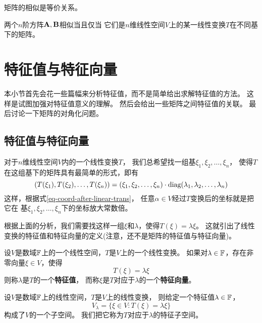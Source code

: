 \begin{remark}
  矩阵的相似是等价关系。
\end{remark}

\begin{theorem}[矩阵相似的等价条件] \label{thrm-mat-sim-equiv-cond}
  两个$n$阶方阵$\mathbf{A},\mathbf{B}$相似当且仅当
  它们是$n$维线性空间$V$上的某一线性变换$T$在不同基下的矩阵。
\end{theorem}

\section{特征值与特征向量}
本小节首先会花一些篇幅来分析特征值，而不是简单给出求解特征值的方法。
这样是试图加强对特征值意义的理解。
然后会给出一些矩阵之间特征值的关联。
最后讨论一下矩阵的对角化问题。

\subsection{特征值与特征向量}
对于$n$维线性空间$V$内的一个线性变换$T$，
我们总希望找一组基$\xi_1,\xi_2,\dots,\xi_n$，
使得$T$在这组基下的矩阵具有最简单的形式，即有
\begin{equation} \label{eq-diagonalizable}
  (T(\xi_1), T(\xi_2),\dots,T(\xi_n)) = (\xi_1,\xi_2,\dots,\xi_n)
    \cdot \textrm{diag}(\lambda_1,\lambda_2,\dots,\lambda_n)
\end{equation}
这样，根据式\ref{eq-coord-after-linear-trans}，
任意$\alpha\in V$经过$T$变换后的坐标就是把它在
基$\xi_1,\xi_2,\dots,\xi_n$下的坐标放大常数倍。

根据上面的分析，我们需要找这样一组$\xi$和$\lambda$，使得$T(\xi) = \lambda\xi$。
这就引出了线性变换的特征值和特征向量的定义(注意，还不是矩阵的特征值与特征向量)。

\begin{definition}[线性变换的特征值和特征向量]
  设$V$是数域$\mathbb{F}$上的一个线性空间，$T$是$V$上的一个线性变换。
  如果对$\lambda\in\mathbb{F}$，存在非零向量$\xi\in V$，使得
  \[ T(\xi) = \lambda\xi \]
  则称$\lambda$是$T$的一个\textbf{特征值}，
  而称$\xi$是$T$对应于$\lambda$的一个\textbf{特征向量}。
\end{definition}

\begin{theorem}[特征子空间]
  设$V$是数域$\mathbb{F}$上的线性空间，$T$是$V$上的线性变换，
  则给定一个特征值$\lambda\in\mathbb{F}$，
  \begin{displaymath}
    V_\lambda = \{ \xi\in V: T(\xi)=\lambda\xi \}
  \end{displaymath}
  构成了$V$的一个子空间。
  我们把它称为$T$对应于$\lambda$的特征子空间。
\end{theorem}


